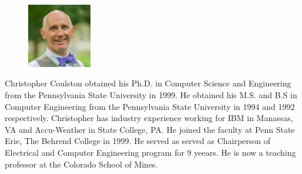 \begin{figure}
\centering
\includegraphics[width=0.25\textwidth]{./Fig/Coulston.jpg}
\end{figure}
Christopher Coulston obtained his Ph.D. in Computer Science and Engineering from the
Pennsylvania State University in 1999. He obtained his M.S. and B.S in
Computer Engineering from the Pennsylvania State University in 1994 and
1992 respectively. Christopher has industry experience working for IBM in
Manassas, VA and Accu-Weather in State College, PA. He joined the
faculty at Penn State Erie, The Behrend College in 1999.  He served as 
served as Chairperson of Electrical and Computer Engineering program
for 9 yeears.  He is now a teaching professor at the Colorado School of Mines.
